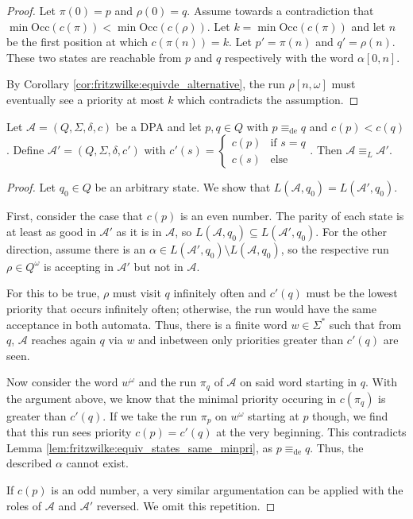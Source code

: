 \begin{proof}
	Let $\pi(0) = p$ and $\rho(0) = q$. Assume towards a contradiction that $\min \text{Occ}(c(\pi)) < \min \text{Occ}(c(\rho))$. Let $k = \min \text{Occ}(c(\pi))$ and let $n$ be the first position at which $c(\pi(n)) = k$. Let $p' = \pi(n)$ and $q' = \rho(n)$. These two states are reachable from $p$ and $q$ respectively with the word $\alpha[0,n]$.
	
	By Corollary \ref{cor:fritzwilke:equivde_alternative}, the run $\rho[n,\omega]$ must eventually see a priority at most $k$ which contradicts the assumption.
\end{proof}


\begin{theorem} 
\label{thm:fritzwilke:combine_priorities}
	Let $\mathcal{A} = (Q, \Sigma, \delta, c)$ be a DPA and let $p, q \in Q$ with $p \equiv_\text{de} q$ and $c(p) < c(q)$. Define $\mathcal{A}' = (Q, \Sigma, \delta, c')$ with $c'(s) = \begin{cases} c(p) & \text{if } s = q \\ c(s) & \text{else} \end{cases}$. Then $\mathcal{A} \equiv_L \mathcal{A}'$.
\end{theorem}

\begin{proof}
	Let $q_0 \in Q$ be an arbitrary state. We show that $L(\mathcal{A}, q_0) = L(\mathcal{A}', q_0)$.
	
	First, consider the case that $c(p)$ is an even number. The parity of each state is at least as good in $\mathcal{A}'$ as it is in $\mathcal{A}$, so $L(\mathcal{A}, q_0) \subseteq L(\mathcal{A}', q_0)$. For the other direction, assume there is an $\alpha \in L(\mathcal{A}', q_0) \setminus L(\mathcal{A}, q_0)$, so the respective run $\rho \in Q^\omega$ is accepting in $\mathcal{A}'$ but not in $\mathcal{A}$. 
	
	For this to be true, $\rho$ must visit $q$ infinitely often and $c'(q)$ must be the lowest priority that occurs infinitely often; otherwise, the run would have the same acceptance in both automata. Thus, there is a finite word $w \in \Sigma^*$ such that from $q$, $\mathcal{A}$ reaches again $q$ via $w$ and inbetween only priorities greater than $c'(q)$ are seen.
	
	Now consider the word $w^\omega$ and the run $\pi_q$ of $\mathcal{A}$ on said word starting in $q$. With the argument above, we know that the minimal priority occuring in $c(\pi_q)$ is greater than $c'(q)$. If we take the run $\pi_p$ on $w^\omega$ starting at $p$ though, we find that this run sees priority $c(p) = c'(q)$ at the very beginning. This contradicts Lemma \ref{lem:fritzwilke:equiv_states_same_minpri}, as $p \equiv_\text{de} q$. Thus, the described $\alpha$ cannot exist. 
	
	If $c(p)$ is an odd number, a very similar argumentation can be applied with the roles of $\mathcal{A}$ and $\mathcal{A}'$ reversed. We omit this repetition.
\end{proof}

